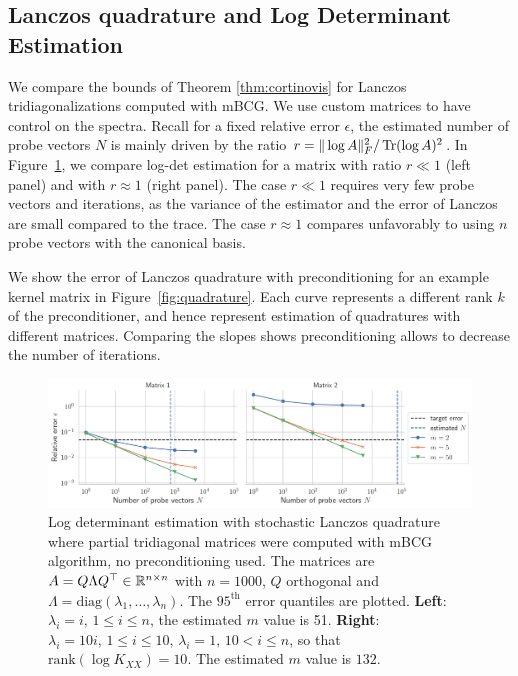 \documentclass{article}
\begin{document}
{\subsection{Lanczos quadrature and Log Determinant Estimation}

We compare the bounds of Theorem \ref{thm:cortinovis} for Lanczos tridiagonalizations computed with mBCG. We use custom matrices to have control on the spectra. 
Recall for a fixed relative error $\epsilon$, the estimated number of probe vectors $N$ is mainly driven by the ratio $r = \Vert \log A \Vert_F^2 / \operatorname{Tr}(\log A)^2$. 
In Figure~\ref{fig:logdet_mbcg}, we compare log-det estimation for a matrix with ratio $r \ll 1$ (left panel) and with $r \approx 1$ (right panel).
The case $r \ll 1$ requires very few probe vectors and iterations, as the variance of the estimator and the error of Lanczos are small compared to the trace. The case $r \approx 1$ compares unfavorably to using $n$ probe vectors with the canonical basis. 

We show the error of Lanczos quadrature with preconditioning for an example kernel matrix in Figure~\ref{fig:quadrature}. 
Each curve represents a different rank $k$ of the preconditioner, and hence represent estimation of quadratures with different matrices. Comparing the slopes shows preconditioning allows to decrease the number of iterations. 

\begin{figure}
    \centering
    \includegraphics[width=\textwidth]{res/logdet_mbcg.pdf}
    \caption{Log determinant estimation with stochastic Lanczos quadrature where partial tridiagonal matrices were computed with mBCG algorithm, no preconditioning used. The matrices are $A = Q \Lambda Q^\top \in \mathbb R^{n \times n}$ with $n=1000$, $Q$ orthogonal and $\Lambda = \text{diag}(\lambda_1, \ldots, \lambda_n)$. The $95^\text{th}$ error quantiles are plotted. \textbf{Left}: $\lambda_i = i, \, 1 \le i \le n$, the estimated $m$ value is 51. \textbf{Right}: $\lambda_i = 10i, \, 1 \le i \le 10$, $\lambda_i = 1, \, 10 < i \le n$, so that $\text{rank}(\log K_{XX}) = 10$. The estimated $m$ value is $132$.}
    \label{fig:logdet_mbcg}
\end{figure}


}
\end{document}
